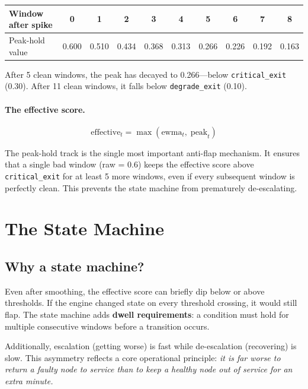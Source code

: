 \documentclass[11pt]{article}
\begin{document}
\begin{center}
\small
\begin{tabular}{lccccccccc}
\toprule
Window after spike & 0 & 1 & 2 & 3 & 4 & 5 & 6 & 7 & 8 \\
\midrule
Peak-hold value & 0.600 & 0.510 & 0.434 & 0.368 & 0.313 & 0.266 & 0.226 & 0.192 & 0.163 \\
\bottomrule
\end{tabular}
\end{center}

After 5 clean windows, the peak has decayed to 0.266---below
\texttt{critical\_exit} (0.30). After 11 clean windows, it falls below
\texttt{degrade\_exit} (0.10).

\paragraph{The effective score.}
\[
  \text{effective}_t = \max(\text{ewma}_t,\; \text{peak}_t)
\]

\begin{keyinsight}
  The peak-hold track is the single most important anti-flap mechanism.
  It ensures that a single bad window (raw = 0.6) keeps the effective score
  above \texttt{critical\_exit} for at least 5 more windows, even if every
  subsequent window is perfectly clean. This prevents the state machine from
  prematurely de-escalating.
\end{keyinsight}


\section{The State Machine}
\label{sec:state-machine}

\subsection{Why a state machine?}

Even after smoothing, the effective score can briefly dip below or above
thresholds. If the engine changed state on every threshold crossing, it
would still flap. The state machine adds \textbf{dwell requirements}:
a condition must hold for multiple consecutive windows before a transition
occurs.

Additionally, escalation (getting worse) is fast while de-escalation
(recovering) is slow. This asymmetry reflects a core operational principle:
\textit{it is far worse to return a faulty node to service than to keep a
healthy node out of service for an extra minute.}
\end{document}
